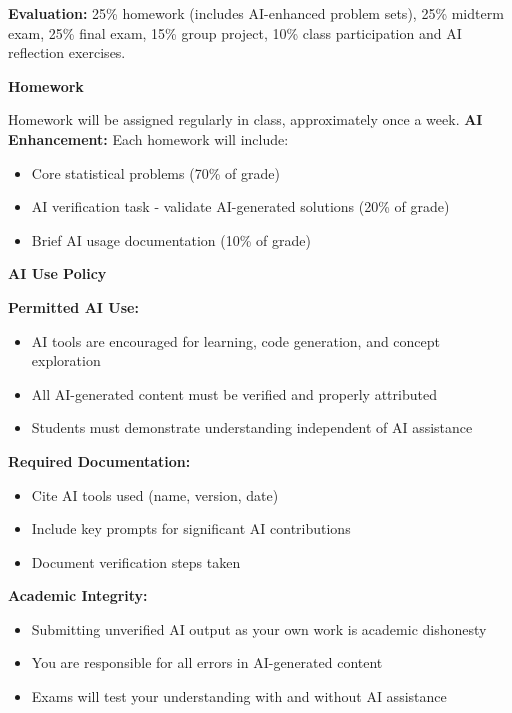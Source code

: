 \documentclass[11pt]{article}
\begin{document}
\vspace{8pt}

\noindent\textbf{Evaluation:} 25\% homework (includes AI-enhanced problem sets), 25\% midterm exam, 25\% final exam, 15\% group project, 10\% class participation and AI reflection exercises.

\vspace{8pt}

\noindent\textbf{Homework}

Homework will be assigned regularly in class, approximately once a week. \textcolor{aiblue}{\textbf{AI Enhancement:} Each homework will include:}
\begin{itemize}[leftmargin=20pt]
\item \textcolor{aiblue}{Core statistical problems (70\% of grade)}
\item \textcolor{aiblue}{AI verification task - validate AI-generated solutions (20\% of grade)}
\item \textcolor{aiblue}{Brief AI usage documentation (10\% of grade)}
\end{itemize}

\vspace{8pt}

\noindent\textbf{AI Use Policy}

\begin{tcolorbox}[colback=aiblue!10,colframe=aiblue,boxrule=1pt,arc=2pt,left=6pt,right=6pt,top=6pt,bottom=6pt]
\textbf{Permitted AI Use:}
\begin{itemize}[leftmargin=10pt]
\item AI tools are encouraged for learning, code generation, and concept exploration
\item All AI-generated content must be verified and properly attributed
\item Students must demonstrate understanding independent of AI assistance
\end{itemize}

\textbf{Required Documentation:}
\begin{itemize}[leftmargin=10pt]
\item Cite AI tools used (name, version, date)
\item Include key prompts for significant AI contributions
\item Document verification steps taken
\end{itemize}

\textbf{Academic Integrity:}
\begin{itemize}[leftmargin=10pt]
\item Submitting unverified AI output as your own work is academic dishonesty
\item You are responsible for all errors in AI-generated content
\item Exams will test your understanding with and without AI assistance
\end{itemize}
\end{tcolorbox}
\end{document}
